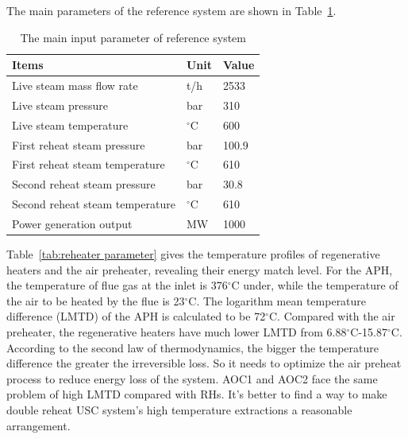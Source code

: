 \documentclass[preprint,12pt]{elsarticle}
\begin{document}
The main parameters of the reference system are shown in Table~\ref{tab:ref input}.

\begin{table}[htbp]
\caption{The main input parameter of reference system }
\label{tab:ref input}
\centering
\begin{tabular}{lll}
\toprule 
Items & Unit & Value\tabularnewline
\midrule
 Live steam mass flow rate 	    	&t/h 			&2533 \\
 Live steam pressure 		    	&bar 			&310\\
 Live steam temperature		     	&$^\circ$C		&600		\\
 First reheat steam pressure    	&bar			&100.9		\\
 First reheat steam temperature  	&$^\circ$C		&610		\\
 Second reheat steam pressure    	&bar			&30.8		\\
 Second reheat steam temperature 	&$^\circ$C		&610		\\
 Power generation output 			&MW				&1000		\\
\bottomrule
\end{tabular}	
\end{table}

Table~\ref{tab:reheater parameter} gives the temperature profiles of regenerative heaters and the air preheater, revealing their energy match level.
For the APH, the temperature of flue gas at the inlet is 376$^\circ$C under, while the temperature of the air to be heated by the flue is 23$^\circ$C.
The logarithm mean temperature difference (LMTD) of the APH is calculated to be 72$^\circ$C.
Compared with the air preheater, the regenerative heaters have much lower LMTD from 6.88$^\circ$C-15.87$^\circ$C.
According to the second law of thermodynamics, the bigger the temperature difference the greater the irreversible loss.
So it needs to optimize the air preheat process to reduce energy loss of the system.
AOC1 and AOC2 face the same problem of high LMTD compared with RHs.
It's better to find a way to make double reheat USC system's high temperature extractions a reasonable arrangement.
\end{document}
